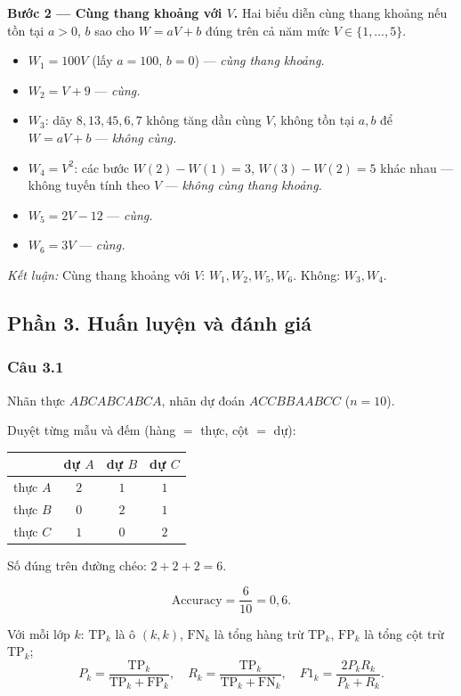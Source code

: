 \textbf{Bước 2 --- Cùng thang khoảng với $V$.} Hai biểu diễn cùng thang khoảng nếu tồn tại $a>0$, $b$ sao cho $W=aV+b$ đúng trên cả năm mức $V\in\{1,\ldots,5\}$.

\begin{itemize}
  \item $W_1=100V$ (lấy $a=100$, $b=0$) --- \emph{cùng thang khoảng.}
  \item $W_2=V+9$ --- \emph{cùng.}
  \item $W_3$: dãy $8,13,45,6,7$ không tăng dần cùng $V$, không tồn tại $a,b$ để $W=aV+b$ --- \emph{không cùng.}
  \item $W_4=V^2$: các bước $W(2)-W(1)=3$, $W(3)-W(2)=5$ khác nhau --- không tuyến tính theo $V$ --- \emph{không cùng thang khoảng.}
  \item $W_5=2V-12$ --- \emph{cùng.}
  \item $W_6=3V$ --- \emph{cùng.}
\end{itemize}

\medskip
\textit{Kết luận:} Cùng thang khoảng với $V$: $W_1,W_2,W_5,W_6$. Không: $W_3,W_4$.

\subsection*{Phần 3. Huấn luyện và đánh giá}

\subsubsection*{Câu 3.1}

Nhãn thực $ABCABCABCA$, nhãn dự đoán $ACCBBAABCC$ ($n=10$).

Duyệt từng mẫu và đếm (hàng $=$ thực, cột $=$ dự):

\begin{center}
\begin{tabular}{c|ccc}
      & dự $A$ & dự $B$ & dự $C$ \\\hline
thực $A$ & $2$ & $1$ & $1$ \\
thực $B$ & $0$ & $2$ & $1$ \\
thực $C$ & $1$ & $0$ & $2$ \\
\end{tabular}
\end{center}

Số đúng trên đường chéo: $2+2+2=6$.

\[
\text{Accuracy}=\frac{6}{10}=0{,}6.
\]

Với mỗi lớp $k$: $\mathrm{TP}_k$ là ô $(k,k)$, $\mathrm{FN}_k$ là tổng hàng trừ $\mathrm{TP}_k$, $\mathrm{FP}_k$ là tổng cột trừ $\mathrm{TP}_k$;
\[
P_k=\frac{\mathrm{TP}_k}{\mathrm{TP}_k+\mathrm{FP}_k},\quad
R_k=\frac{\mathrm{TP}_k}{\mathrm{TP}_k+\mathrm{FN}_k},\quad
F1_k=\frac{2P_kR_k}{P_k+R_k}.
\]

